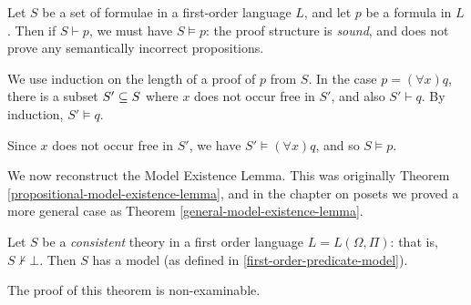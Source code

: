 \documentclass{article}
\begin{document}
\begin{theorem}
	\label{first-order-soundness-theorem}
    Let $S$ be a set of formulae in a first-order language $L$, and let $p$ be a formula in $L$. Then if $S \vdash p$, we must have $S \vDash p$: the proof structure is \textit{sound}, and does not prove any semantically incorrect propositions.
\end{theorem}

\begin{prf}
    We use induction on the length of a proof of $p$ from $S$. In the case $p = (\forall x) q$, there is a subset $S' \subseteq S$ where $x$ does not occur free in $S'$, and also $S' \vdash q$. By induction, $S' \vDash q$.
    
    Since $x$ does not occur free in $S'$, we have $S' \vDash (\forall x) q$, and so $S \vDash p$.
\end{prf}

We now reconstruct the Model Existence Lemma. This was originally Theorem \ref{propositional-model-existence-lemma}, and in the chapter on posets we proved a more general case as Theorem \ref{general-model-existence-lemma}.

\begin{theorem}
	\label{first-order-model-existence-lemma}
    Let $S$ be a \textit{consistent} theory in a first order language $L = L(\Omega, \Pi)$: that is, $S \not\vdash \bot$. Then $S$ has a model (as defined in \ref{first-order-predicate-model}).
\end{theorem}

\begin{note}
	The proof of this theorem is non-examinable.
\end{note}
\end{document}
